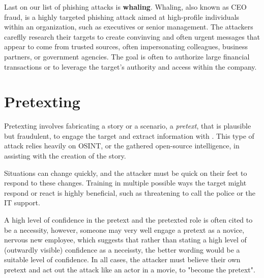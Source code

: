 Last on our list of phishing attacks is \textbf{whaling}. Whaling, also known as CEO fraud, is a highly targeted phishing attack aimed at high-profile individuals within an organization, such as executives or senior management. The attackers careflly research their targets to create convinving and often urgent messages that appear to come from trusted sources, often impersonating colleagues, business partners, or government agencies. The goal is often to authorize large financial transactions or to leverage the target's authority and access within the company.

\section{Pretexting}

Pretexting involves fabricating a story or a scenario, a \textit{pretext}, that is plausible but fraudulent, to engage the target and extract information with \citep{conteh_cybersecurityrisks_2016}. This type of attack relies heavily on OSINT, or the gathered open-source intelligence, in assisting with the creation of the story.

Situations can change quickly, and the attacker must be quick on their feet to respond to these changes. Training in multiple possible ways the target might respond or react is highly beneficial, such as threatening to call the police or the IT support.

A high level of confidence in the pretext and the pretexted role is often cited to be a necessity, however, someone may very well engage a pretext as a novice, nervous new employee, which suggests that rather than stating a high level of (outwardly visible) confidence as a neceissty, the better wording would be a suitable level of confidence. In all cases, the attacker must believe their own pretext and act out the attack like an actor in a movie, to "become the pretext".


